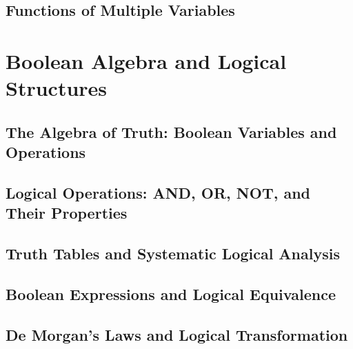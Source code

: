 \documentclass[12pt, oneside, openany]{book}
\begin{document}
\section{Functions of Multiple Variables}


\chapter{Boolean Algebra and Logical Structures}

\section{The Algebra of Truth: Boolean Variables and Operations}

\section{Logical Operations: AND, OR, NOT, and Their Properties}

\section{Truth Tables and Systematic Logical Analysis}

\section{Boolean Expressions and Logical Equivalence}

\section{De Morgan's Laws and Logical Transformation}
\end{document}
